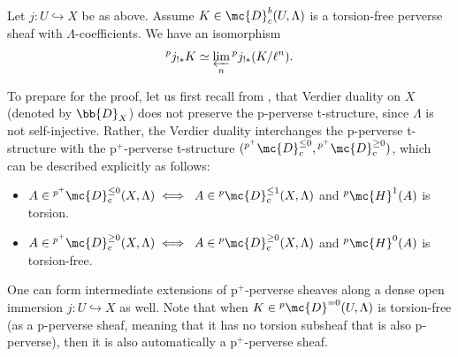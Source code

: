 \begin{theorem}{\label{thm: inverselimit}}
    Let $j: U\hookrightarrow X$ be as above. Assume $K \in \mc{D}_{c}^{b}(U,\Lambda)$ is a torsion-free perverse sheaf with $\Lambda$-coefficients. We have an isomorphism
    \[{}^pj_{!\ast}K\simeq \varprojlim_n{}^pj_{!\ast}(K/\ell^n).\]
\end{theorem}
To prepare for the proof, let us first recall from \cite[\S~3.3]{BBD}, \cite[Section 2]{JuteauDecompositionNumbers} that Verdier duality on $X$ (denoted by $\bb{D}_X$) does not preserve the p-perverse t-structure, since $\Lambda$ is not self-injective. Rather, the Verdier duality interchanges the p-perverse t-structure with the p$^+$-perverse t-structure $(\phantom{}^{p^+}\mc{D}_{\mathrm{c}}^{\leq 0}, \phantom{}^{p^+}\mc{D}_{\mathrm{c}}^{\geq 0})$, which can be described explicitly as follows:
\begin{itemize}
    \item $A\in \phantom{}^{p^+}\mc{D}_{\mathrm{c }}^{\leq 0}(X,\Lambda)\iff$ $A \in \phantom{}^p\mc{D}_{\mathrm{c }}^{\leq 1}(X,\Lambda)$ and $\phantom{}^p\mc{H}^1(A)$ is torsion.
    \item $A\in \phantom{}^{p^+}\mc{D}_{\mathrm{c }}^{\geq 0}(X,\Lambda)\iff$ $A \in \phantom{}^p\mc{D}_{\mathrm{c }}^{\geq 0}(X,\Lambda)$ and $\phantom{}^p\mc{H}^0(A)$ is torsion-free.
\end{itemize}
One can form intermediate extensions of p$^+$-perverse sheaves along a dense open immersion $j:U\hookrightarrow X$ as well. Note that when $K\in \phantom{}^p\mc{D}^{=0}(U,\Lambda)$ is torsion-free (as a p-perverse sheaf, meaning that it has no torsion subsheaf that is also p-perverse), then it is also automatically a p$^+$-perverse sheaf.

